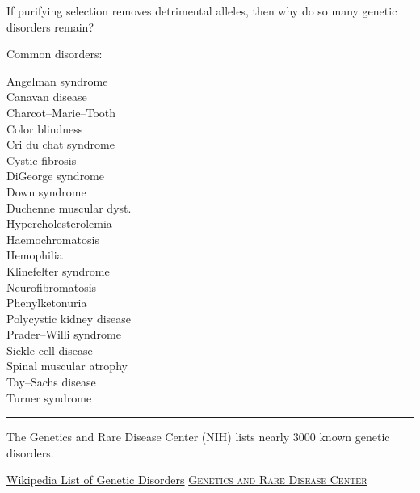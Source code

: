\documentclass[t]{beamer}
\begin{document}

\begin{frame}[t]{If purifying selection removes detrimental alleles, then why do so many genetic disorders remain?}

Common disorders:

\begin{multicols}{3}
{\small 
Angelman syndrome\\
Canavan disease\\
Charcot–Marie–Tooth\\
Color blindness\\
Cri du chat syndrome\\
Cystic fibrosis\\
DiGeorge syndrome\\
Down syndrome\\
Duchenne muscular dyst.\\
Hypercholesterolemia\\
Haemochromatosis\\
Hemophilia\\
Klinefelter syndrome\\
Neurofibromatosis\\
Phenylketonuria\\
Polycystic kidney disease\\
Prader–Willi syndrome\\
Sickle cell disease\\
Spinal muscular atrophy\\
Tay–Sachs disease\\
Turner syndrome\\
}
\end{multicols}

\hrule

\hangpara The Genetics and Rare Disease Center (NIH) lists nearly 3000 known genetic disorders.

\vfilll

\tiny \href{https://en.wikipedia.org/wiki/List_of_genetic_disorders}{Wikipedia List of Genetic Disorders} \hfill \href{https://rarediseases.info.nih.gov/diseases/diseases-by-category/5/congenital-and-genetic-diseases}{\textsc{Genetics and Rare Disease Center}}

\end{frame}

\end{document}
